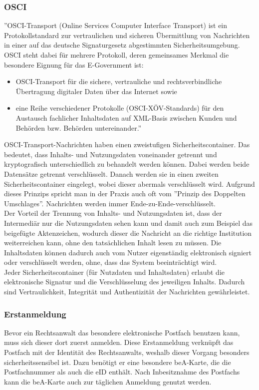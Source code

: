 \subsubsection{OSCI}
''OSCI-Transport (Online Services Computer Interface Transport) ist ein Protokollstandard zur vertraulichen und sicheren Übermittlung von Nachrichten in einer auf das deutsche Signaturgesetz abgestimmten Sicherheitsumgebung. OSCI steht dabei für mehrere Protokoll, deren gemeinsames Merkmal die besondere Eignung für das E-Government ist:
\begin{itemize}
	\item OSCI-Transport für die sichere, vertrauliche und rechtsverbindliche Übertragung digitaler Daten über das Internet sowie
	\item eine Reihe verschiedener Protokolle (OSCI-XÖV-Standards) für den Austausch fachlicher Inhaltsdaten auf XML-Basis zwischen Kunden und Behörden bzw. Behörden untereinander.'' \textcite{bea:osci}
\end{itemize}

OSCI-Transport-Nachrichten haben einen zweistufigen Sicherheitscontainer. Das bedeutet, dass Inhalts- und Nutzungsdaten voneinander getrennt und kryptografisch unterschiedlich zu behandelt werden können. Dabei werden beide Datensätze getrennt verschlüsselt. Danach werden sie in einen zweiten Sicherheitscontainer eingelegt, wobei dieser abermals verschlüsselt wird. Aufgrund dieses Prinzips spricht man in der Praxis auch oft vom ''Prinzip des Doppelten Umschlages''. Nachrichten werden immer Ende-zu-Ende-verschlüsselt. \\
Der Vorteil der Trennung von Inhalts- und Nutzungsdaten ist, dass der Intermediär nur die Nutzungsdaten sehen kann und damit auch zum Beispiel das beigefügte Aktenzeichen, wodurch dieser die Nachricht an die richtige Institution weiterreichen kann, ohne den tatsächlichen Inhalt lesen zu müssen. Die Inhaltsdaten können dadurch auch vom Nutzer eigenständig elektronisch signiert oder verschlüsselt werden, ohne, dass das System beeinträchtigt wird. \\
Jeder Sicherheitscontainer (für Nutzdaten und Inhaltsdaten) erlaubt die elektronische Signatur und die Verschlüsselung des jeweiligen Inhalts. Dadurch sind Vertraulichkeit, Integrität und Authentizität der Nachrichten gewährleistet.

\subsubsection{Erstanmeldung}
Bevor ein Rechtsanwalt das besondere elektronische Postfach benutzen kann, muss sich dieser dort zuerst anmelden. Diese Erstanmeldung verknüpft das Postfach mit der Identität des Rechtsanwalts, weshalb dieser Vorgang besonders sicherheitssensibel ist. Dazu benötigt er eine besondere beA-Karte, die die Postfachnummer als auch die eID enthält. Nach Inbesitznahme des Postfachs kann die beA-Karte auch zur täglichen Anmeldung genutzt werden.

